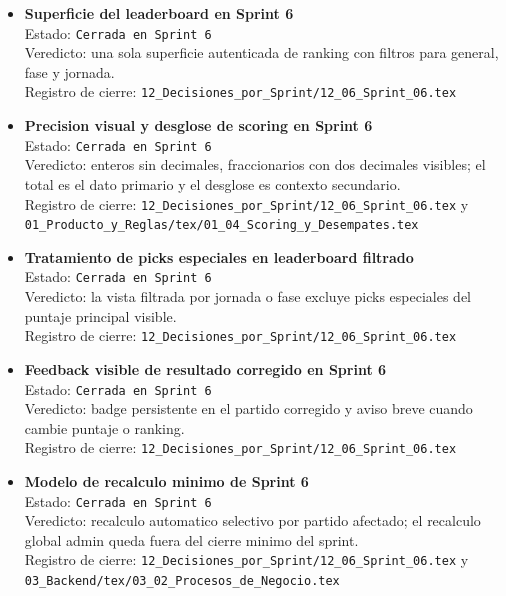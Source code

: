 \begin{itemize}
  \item \textbf{Superficie del leaderboard en Sprint 6}\\
  Estado: \texttt{Cerrada en Sprint 6}\\
  Veredicto: una sola superficie autenticada de ranking con filtros para general, fase y jornada.\\
  Registro de cierre: \texttt{12\_Decisiones\_por\_Sprint/12\_06\_Sprint\_06.tex}

  \item \textbf{Precision visual y desglose de scoring en Sprint 6}\\
  Estado: \texttt{Cerrada en Sprint 6}\\
  Veredicto: enteros sin decimales, fraccionarios con dos decimales visibles; el total es el dato primario y el desglose es contexto secundario.\\
  Registro de cierre: \texttt{12\_Decisiones\_por\_Sprint/12\_06\_Sprint\_06.tex} y \texttt{01\_Producto\_y\_Reglas/tex/01\_04\_Scoring\_y\_Desempates.tex}

  \item \textbf{Tratamiento de picks especiales en leaderboard filtrado}\\
  Estado: \texttt{Cerrada en Sprint 6}\\
  Veredicto: la vista filtrada por jornada o fase excluye picks especiales del puntaje principal visible.\\
  Registro de cierre: \texttt{12\_Decisiones\_por\_Sprint/12\_06\_Sprint\_06.tex}

  \item \textbf{Feedback visible de resultado corregido en Sprint 6}\\
  Estado: \texttt{Cerrada en Sprint 6}\\
  Veredicto: badge persistente en el partido corregido y aviso breve cuando cambie puntaje o ranking.\\
  Registro de cierre: \texttt{12\_Decisiones\_por\_Sprint/12\_06\_Sprint\_06.tex}

  \item \textbf{Modelo de recalculo minimo de Sprint 6}\\
  Estado: \texttt{Cerrada en Sprint 6}\\
  Veredicto: recalculo automatico selectivo por partido afectado; el recalculo global admin queda fuera del cierre minimo del sprint.\\
  Registro de cierre: \texttt{12\_Decisiones\_por\_Sprint/12\_06\_Sprint\_06.tex} y \texttt{03\_Backend/tex/03\_02\_Procesos\_de\_Negocio.tex}


\end{itemize}

